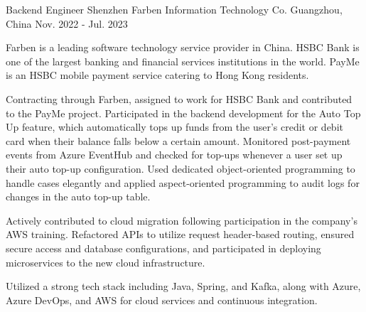 \begin{cventries}
  \cventry
    {Backend Engineer} %
    {Shenzhen Farben Information Technology Co.} %
    {Guangzhou, China} %
    {Nov. 2022 - Jul. 2023} %
    {
      \begin{cvitems} %
        \item {Farben is a leading software technology service provider in China. HSBC Bank is one of the largest banking and financial services institutions in the world. PayMe is an HSBC mobile payment service catering to Hong Kong residents.}
        \item {Contracting through Farben, assigned to work for HSBC Bank and contributed to the PayMe project. Participated in the backend development for the Auto Top Up feature, which automatically tops up funds from the user's credit or debit card when their balance falls below a certain amount. Monitored post-payment events from Azure EventHub and checked for top-ups whenever a user set up their auto top-up configuration. Used dedicated object-oriented programming to handle cases elegantly and applied aspect-oriented programming to audit logs for changes in the auto top-up table.}
        \item {Actively contributed to cloud migration following participation in the company's AWS training. Refactored APIs to utilize request header-based routing, ensured secure access and database configurations, and participated in deploying microservices to the new cloud infrastructure.}
        \item {Utilized a strong tech stack including Java, Spring, and Kafka, along with Azure, Azure DevOps, and AWS for cloud services and continuous integration.}
      \end{cvitems}
    }


\end{cventries}
